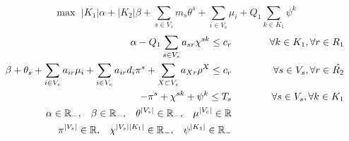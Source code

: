 \documentclass[12pt]{article}
\begin{document}
\vspace{5mm}
$$\max \,\, |K_1|\alpha + |K_2|\beta + \sum\limits_{s \in V_s}{m_s \theta^s} + \sum\limits_{i \in V_c}{ \mu_i }  + Q_1 \sum\limits_{k \in K_1}{ \psi^k }$$
\begin{eqnarray}
\label{dual01}
  \alpha - Q_1 \sum\limits_{s \in V_s}{a_{sr} \chi^{sk}} \le c_r & \hspace{1cm} & \forall k \in K_1, \forall r \in R_1 \\
\label{dual02}
  \beta + \theta_s + \sum\limits_{i \in V_c}{a_{ir} \mu_i} + \sum\limits_{i \in V_c}{a_{ir} d_i \pi^s} + \sum\limits_{X \subset V_c} { a_{Xr} \rho^X } \le c_r & & \forall s \in V_s, \forall r \in \hat{R_2} \\
\label{dual03}
  - \pi^s + \chi^{sk} + \psi^k \le T_s & \hspace{1cm} & \forall s \in V_s, \forall k \in K_1 \\
\label{dual04}
  \alpha \in \mathbb{R_-}, \hspace{3mm} \beta \in \mathbb{R_-}, \hspace{3mm} \theta^{|V_s|} \in \mathbb{R_-}, \hspace{3mm} \mu^{|V_c|} \in \mathbb{R}\\
  \pi^{|V_s|} \in \mathbb{R}, \hspace{3mm} \chi^{|V_s||K_1|} \in \mathbb{R_-}, \hspace{3mm} \psi^{|K_1|} \in \mathbb{R_-} \nonumber
\end{eqnarray}
\end{document}
